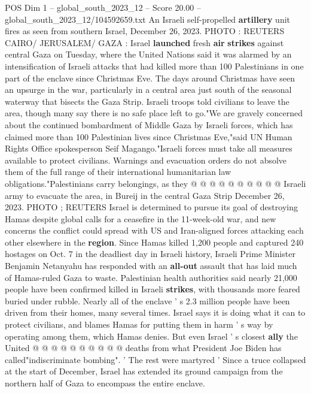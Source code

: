 \begin{textsample}{POS Dim 1 – global\_south\_2023\_12 – Score 20.00 – global\_south\_2023\_12/104592659.txt}  \label{ex:f1_pos_167}
An Israeli self-propelled \textbf{artillery} unit fires as seen from southern Israel, December 26, 2023.
PHOTO : REUTERS CAIRO/ JERUSALEM/ GAZA : Israel \textbf{launched} fresh \textbf{air} \textbf{strikes} against central Gaza on Tuesday, where the United Nations said it was alarmed by an intensification of Israeli attacks that had killed more than 100 Palestinians in one part of the enclave since Christmas Eve.
The days around Christmas have seen an upsurge in the war, particularly in a central area just south of the seasonal waterway that bisects the Gaza Strip.
Israeli troops told civilians to leave the area, though many say there is no safe place left to go."We are gravely concerned about the continued bombardment of Middle Gaza by Israeli forces, which has claimed more than 100 Palestinian lives since Christmas Eve,"said UN Human Rights Office spokesperson Seif Magango."Israeli forces must take all measures available to protect civilians.
Warnings and evacuation orders do not absolve them of the full range of their international humanitarian law obligations."Palestinians carry belongings, as they @ @ @ @ @ @ @ @ @ @ Israeli army to evacuate the area, in Bureij in the central Gaza Strip December 26, 2023.
PHOTO ; REUTERS Israel is determined to pursue its goal of destroying Hamas despite global calls for a ceasefire in the 11-week-old war, and new concerns the conflict could spread with US and Iran-aligned forces attacking each other elsewhere in the \textbf{region}.
Since Hamas killed 1,200 people and captured 240 hostages on Oct. 7 in the deadliest day in Israeli history, Israeli Prime Minister Benjamin Netanyahu has responded with an \textbf{all-out} assault that has laid much of Hamas-ruled Gaza to waste.
Palestinian health authorities said nearly 21,000 people have been confirmed killed in Israeli \textbf{strikes}, with thousands more feared buried under rubble.
Nearly all of the enclave ' s 2.3 million people have been driven from their homes, many several times.
Israel says it is doing what it can to protect civilians, and blames Hamas for putting them in harm ' s way by operating among them, which Hamas denies.
But even Israel ' s closest \textbf{ally} the United @ @ @ @ @ @ @ @ @ @ deaths from what President Joe Biden has called"indiscriminate bombing". ' The rest were martyred ' Since a truce collapsed at the start of December, Israel has extended its ground campaign from the northern half of Gaza to encompass the entire enclave.

\end{textsample}
